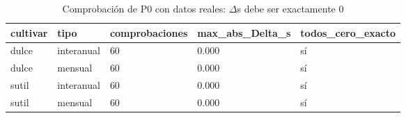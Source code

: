 \begin{table}[H]
\centering
\small
\caption{Comprobación de P0 con datos reales: $\Delta$s debe ser exactamente 0}
\label{tab:T_comprobacion_P0}
\begin{tabular}{lllll}
\toprule
cultivar & tipo & comprobaciones & max\_abs\_Delta\_s & todos\_cero\_exacto \\
\midrule
dulce & interanual & 60 & 0.000 & sí \\
dulce & mensual & 60 & 0.000 & sí \\
sutil & interanual & 60 & 0.000 & sí \\
sutil & mensual & 60 & 0.000 & sí \\
\bottomrule
\end{tabular}
\end{table}